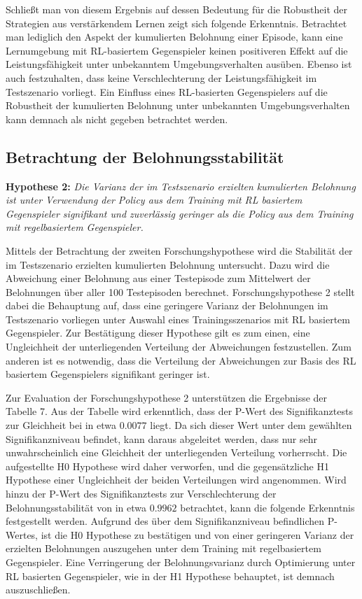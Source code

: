 Schließt man von diesem Ergebnis auf dessen Bedeutung für die Robustheit der Strategien aus verstärkendem Lernen zeigt sich folgende Erkenntnis.
Betrachtet man lediglich den Aspekt der kumulierten Belohnung einer Episode, kann eine Lernumgebung mit RL-basiertem Gegenspieler keinen positiveren Effekt auf die Leistungsfähigkeit unter unbekanntem Umgebungsverhalten ausüben.
Ebenso ist auch festzuhalten, dass keine Verschlechterung der Leistungsfähigkeit im Testszenario vorliegt. 
Ein Einfluss eines RL-basierten Gegenspielers auf die Robustheit der kumulierten Belohnung unter unbekannten Umgebungsverhalten kann demnach als nicht gegeben betrachtet werden.

\subsection{Betrachtung der Belohnungsstabilität}

\textbf{Hypothese 2:}
\textit{Die Varianz der im Testszenario erzielten kumulierten Belohnung ist unter Verwendung der Policy aus dem Training mit RL basiertem Gegenspieler signifikant und zuverlässig geringer als die Policy aus dem Training mit regelbasiertem Gegenspieler.}

Mittels der Betrachtung der zweiten Forschungshypothese wird die Stabilität der im Testszenario erzielten kumulierten Belohnung untersucht.
Dazu wird die Abweichung einer Belohnung aus einer Testepisode zum Mittelwert der Belohnungen über aller 100 Testepisoden berechnet.
Forschungshypothese 2 stellt dabei die Behauptung auf, dass eine geringere Varianz der Belohnungen im Testszenario vorliegen unter Auswahl eines Trainingsszenarios mit RL basiertem Gegenspieler.
Zur Bestätigung dieser Hypothese gilt es zum einen, eine Ungleichheit der unterliegenden Verteilung der Abweichungen festzustellen.
Zum anderen ist es notwendig, dass die Verteilung der Abweichungen zur Basis des RL basiertem Gegenspielers signifikant geringer ist.

Zur Evaluation der Forschungshypothese 2 unterstützen die Ergebnisse der Tabelle 7.
Aus der Tabelle wird erkenntlich, dass der P-Wert des Signifikanztests zur Gleichheit bei in etwa $0.0077$ liegt.
Da sich dieser Wert unter dem gewählten Signifikanzniveau befindet, kann daraus abgeleitet werden, dass nur sehr unwahrscheinlich eine Gleichheit der unterliegenden Verteilung vorherrscht.
Die aufgestellte H0 Hypothese wird daher verworfen, und die gegensätzliche H1 Hypothese einer Ungleichheit der beiden Verteilungen wird angenommen.
Wird hinzu der P-Wert des Signifikanztests zur Verschlechterung der Belohnungsstabilität von in etwa $0.9962$ betrachtet, kann die folgende Erkenntnis festgestellt werden.
Aufgrund des über dem Signifikanzniveau befindlichen P-Wertes, ist die H0 Hypothese zu bestätigen und von einer geringeren Varianz der erzielten Belohnungen auszugehen unter dem Training mit regelbasiertem Gegenspieler.
Eine Verringerung der Belohnungsvarianz durch Optimierung unter RL basierten Gegenspieler, wie in der H1 Hypothese behauptet, ist demnach auszuschließen.

